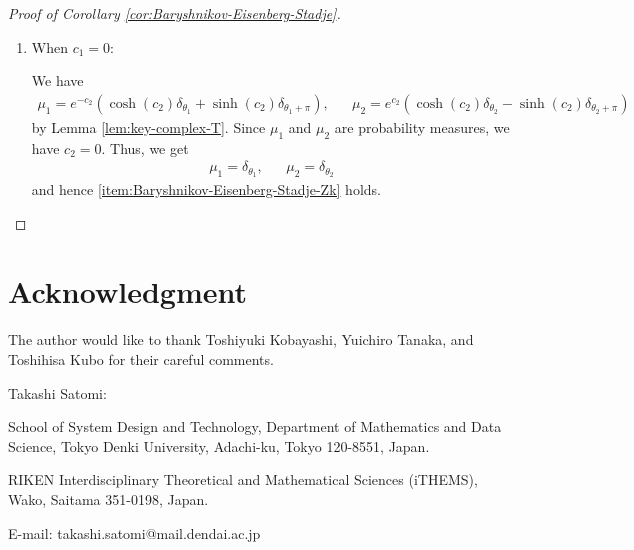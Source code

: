 \documentclass[12pt]{article}
\theoremstyle{definition}
\theoremstyle{remark}
\numberwithin{equation}{section}
\numberwithin{figure}{section}
\numberwithin{table}{section}
\begin{document}
\begin{proof}[Proof of Corollary \ref{cor:Baryshnikov-Eisenberg-Stadje}]
\begin{enumerate}[label=(Case \arabic*)]
\item

When $ c_1 = 0 $:

We have
\begin{align}
    \mu_1 = e^{ - c_2 } ( \cosh ( c_2 ) \delta_{ \theta_1 } + \sinh ( c_2 ) \delta_{ \theta_1 + \pi } ) , & &
    \mu_2 = e^{ c_2 } ( \cosh ( c_2 ) \delta_{ \theta_2 } - \sinh ( c_2 ) \delta_{ \theta_2 + \pi } )
\end{align}
by Lemma \ref{lem:key-complex-T}.
Since $ \mu_1 $ and $ \mu_2 $ are probability measures, we have $ c_2 = 0 $.
Thus, we get
\begin{align}
    \mu_1 = \delta_{ \theta_1 } , & &
    \mu_2 = \delta_{ \theta_2 }
\end{align}
and hence \ref{item:Baryshnikov-Eisenberg-Stadje-Zk} holds.
\qedhere
\end{enumerate}
    
\end{proof}

\section*{Acknowledgment}
The author would like to thank Toshiyuki Kobayashi, Yuichiro Tanaka, and Toshihisa Kubo %
for their careful comments.

\printbibliography

\noindent
Takashi Satomi: 

\noindent
School of System Design and Technology, Department of Mathematics and Data Science, Tokyo Denki University, Adachi-ku, Tokyo 120-8551, Japan.

\noindent
RIKEN Interdisciplinary Theoretical and Mathematical Sciences (iTHEMS), Wako, Saitama 351-0198, Japan.

\noindent
E-mail: takashi.satomi@mail.dendai.ac.jp
\end{document}
